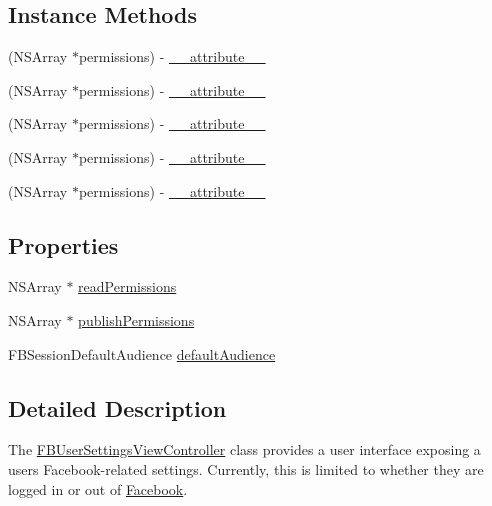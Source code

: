 \subsection*{Instance Methods}
\begin{DoxyCompactItemize}
\item 
(N\+S\+Array $\ast$permissions) -\/ \hyperlink{interfaceFBUserSettingsViewController_a5ff3dd369720aa3e7f79439735be3292}{\+\_\+\+\_\+attribute\+\_\+\+\_\+}
\item 
(N\+S\+Array $\ast$permissions) -\/ \hyperlink{interfaceFBUserSettingsViewController_a5ff3dd369720aa3e7f79439735be3292}{\+\_\+\+\_\+attribute\+\_\+\+\_\+}
\item 
(N\+S\+Array $\ast$permissions) -\/ \hyperlink{interfaceFBUserSettingsViewController_a5ff3dd369720aa3e7f79439735be3292}{\+\_\+\+\_\+attribute\+\_\+\+\_\+}
\item 
(N\+S\+Array $\ast$permissions) -\/ \hyperlink{interfaceFBUserSettingsViewController_a5ff3dd369720aa3e7f79439735be3292}{\+\_\+\+\_\+attribute\+\_\+\+\_\+}
\item 
(N\+S\+Array $\ast$permissions) -\/ \hyperlink{interfaceFBUserSettingsViewController_a5ff3dd369720aa3e7f79439735be3292}{\+\_\+\+\_\+attribute\+\_\+\+\_\+}
\end{DoxyCompactItemize}
\subsection*{Properties}
\begin{DoxyCompactItemize}
\item 
N\+S\+Array $\ast$ \hyperlink{interfaceFBUserSettingsViewController_af56bf48947bab6965b9110d6896fb545}{read\+Permissions}
\item 
N\+S\+Array $\ast$ \hyperlink{interfaceFBUserSettingsViewController_a54b2318ef5adf14a669c2a8cc5e614c0}{publish\+Permissions}
\item 
F\+B\+Session\+Default\+Audience \hyperlink{interfaceFBUserSettingsViewController_aff55a97031c0f64ca7a3d00571238009}{default\+Audience}
\end{DoxyCompactItemize}


\subsection{Detailed Description}
The {\ttfamily \hyperlink{interfaceFBUserSettingsViewController}{F\+B\+User\+Settings\+View\+Controller}} class provides a user interface exposing a user\textquotesingle{}s Facebook-\/related settings. Currently, this is limited to whether they are logged in or out of \hyperlink{interfaceFacebook}{Facebook}.

